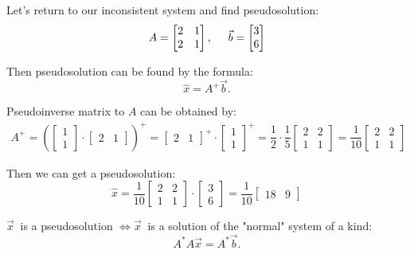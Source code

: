 \par
Let's return to our inconsistent system and find pseudosolution:
\[
    A = \begin{bmatrix}
        2 & 1\\
        2 & 1
    \end{bmatrix}, \hspace*{0.5cm} \vec{b} = \begin{bmatrix}
        3 \\ 6
    \end{bmatrix}  
\]

Then pseudosolution can be found by the formula:
\[
    \hat{x} = A^+\vec{b}.  
\]

Pseudoinverse matrix to $A$ can be obtained by:
\begin{gather*}
    A^+ = \left( \begin{bmatrix}
        1 \\ 1
    \end{bmatrix} \cdot \begin{bmatrix}
        2 & 1
    \end{bmatrix}\right)^+ = \begin{bmatrix}
        2 & 1
    \end{bmatrix}^+ \cdot \begin{bmatrix}
        1 \\ 1
    \end{bmatrix}^+ = \dfrac{1}{2}\cdot\dfrac{1}{5} \begin{bmatrix}
        2 & 2 \\
        1 & 1
    \end{bmatrix} = \dfrac{1}{10} \begin{bmatrix}
        2 & 2 \\
        1 & 1
    \end{bmatrix}
\end{gather*}

Then we can get a pseudosolution:
\[
    \hat{x} = \dfrac{1}{10} \begin{bmatrix}
        2 & 2 \\
        1 & 1
    \end{bmatrix} \cdot \begin{bmatrix}
        3 \\ 
        6
    \end{bmatrix} = \dfrac{1}{10} \begin{bmatrix}
        18 & 9
    \end{bmatrix}
\]
\begin{proposition}{}{}
    $\vec{x}\ $ is a pseudosolution $\Longleftrightarrow \vec{x}\ $ is a solution of the "normal" system of a kind:
    \[
        A^*A\vec{x} = A^*\vec{b}.  
    \]
\end{proposition}

